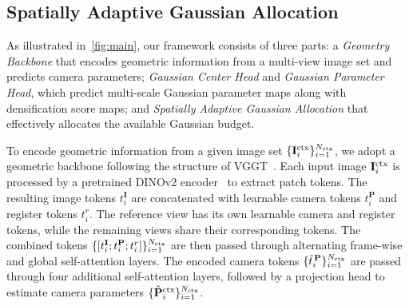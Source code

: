 
\subsection{Spatially Adaptive Gaussian Allocation}
\label{sec3.2:SADA}
As illustrated in~\cref{fig:main}, our framework consists of three parts: 
a \textit{Geometry Backbone} that encodes geometric information from a multi-view image set and predicts camera parameters; \textit{Gaussian Center Head} and \textit{Gaussian Parameter Head}, which predict multi-scale Gaussian parameter maps along with densification score maps; and \textit{Spatially Adaptive Gaussian Allocation} that effectively allocates the available Gaussian budget.

To encode geometric information from a given image set $\{\mathbf{I}^{\text{ctx}}_i\}_{i=1}^{N_{\text{ctx}}}$, we adopt a geometric backbone following the structure of VGGT~\cite{wang2025vggt}. 
Each input image $\mathbf{I}^{\text{ctx}}_i$ is processed by a pretrained DINOv2 encoder~\cite{oquab2023dinov2} to extract patch tokens. 
The resulting image tokens $t^\mathbf{I}_i$ are concatenated with learnable camera tokens $t^\mathbf{P}_i$ and register tokens $t^r_i$. 
The reference view has its own learnable camera and register tokens, while the remaining views share their corresponding tokens. 
The combined tokens $\{[t^\mathbf{I}_i; t^\mathbf{P}_i; t^r_i]\}_{i=1}^{N_{\text{ctx}}}$ are then passed through alternating frame-wise and global self-attention layers.
The encoded camera tokens $\{\tilde{t}^{\,\mathbf{P}}_i\}_{i=1}^{N_{\text{ctx}}}$ are passed through four additional self-attention layers, followed by a projection head to estimate camera parameters $\{\hat{\mathbf{P}}_i^{\text{ctx}}\}^{N_{\text{ctx}}}_{i=1}$. 

